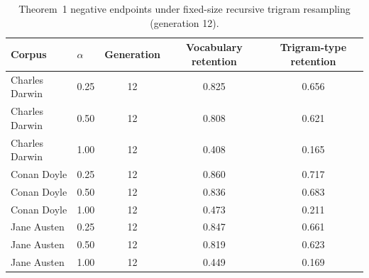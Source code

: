\begin{table}[t]
\centering
\caption{Theorem~1 negative endpoints under fixed-size recursive trigram resampling (generation 12).}
\label{tab:appx-theorem1-negative-endpoints}
\begin{tabular}{llccc}
\toprule
Corpus & $\alpha$ & Generation & Vocabulary retention & Trigram-type retention \\
\midrule
Charles Darwin & 0.25 & 12 & 0.825 & 0.656 \\
Charles Darwin & 0.50 & 12 & 0.808 & 0.621 \\
Charles Darwin & 1.00 & 12 & 0.408 & 0.165 \\
Conan Doyle & 0.25 & 12 & 0.860 & 0.717 \\
Conan Doyle & 0.50 & 12 & 0.836 & 0.683 \\
Conan Doyle & 1.00 & 12 & 0.473 & 0.211 \\
Jane Austen & 0.25 & 12 & 0.847 & 0.661 \\
Jane Austen & 0.50 & 12 & 0.819 & 0.623 \\
Jane Austen & 1.00 & 12 & 0.449 & 0.169 \\
\bottomrule
\end{tabular}
\end{table}
